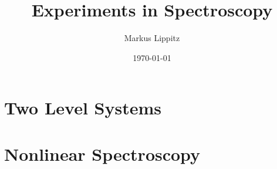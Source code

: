 \documentclass[notoc,nofonts,a4paper,oneside,nobib]{tufte-book}
\begin{document}
\title{Experiments in Spectroscopy}

\author{Markus Lippitz}
\date{\today}


\maketitle


%
\tableofcontents








%
\part{Two Level Systems}







\part{Nonlinear Spectroscopy}







%
%
%
%
%
%
%
%
%


%
%
%
%
%
%
%



\printbibliography
\end{document}
